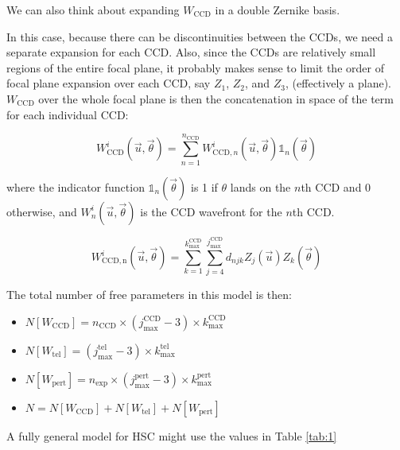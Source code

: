 \documentclass{article}
\begin{document}
We can also think about expanding $W_\mathrm{CCD}$ in a double Zernike basis.

In this case, because there can be discontinuities between the CCDs, we need a separate expansion
for each CCD.  Also, since the CCDs are relatively small regions of the entire focal plane, it
probably makes sense to limit the order of focal plane expansion over each CCD, say $Z_1$, $Z_2$,
and $Z_3$, (effectively a plane).  $W_\mathrm{CCD}$ over the whole focal plane is then the
concatenation in space of the term for each individual CCD:

\begin{equation}
    W^i_\mathrm{CCD}(\vec{u}, \vec{\theta}) = \sum_{n=1}^{n_\mathrm{CCD}} W^i_{\mathrm{CCD},n}(\vec{u}, \vec{\theta}) \mathbb{1}_n(\vec{\theta})
\end{equation}

where the indicator function $\mathbb{1}_n(\vec{\theta})$ is 1 if $\theta$ lands on the $n$th CCD
and 0 otherwise, and $W^i_n(\vec{u}, \vec{\theta})$ is the CCD wavefront for the $n$th CCD.

\begin{equation}
    W^i_\mathrm{CCD,n}(\vec{u}, \vec{\theta}) = \sum_{k=1}^{k^\mathrm{CCD}_\mathrm{max}} \sum_{j=4}^{j^\mathrm{CCD}_\mathrm{max}} d_{njk} Z_j(\vec{u}) Z_k(\vec{\theta})
\end{equation}

The total number of free parameters in this model is then:

\begin{itemize}
    \item $N[W_\mathrm{CCD}] = n_\mathrm{CCD} \times (j^\mathrm{CCD}_\mathrm{max}-3) \times k^\mathrm{CCD}_\mathrm{max}$
    \item $N[W_\mathrm{tel}] = (j^\mathrm{tel}_\mathrm{max}-3) \times k^\mathrm{tel}_\mathrm{max}$
    \item $N[W_\mathrm{pert}] = n_\mathrm{exp} \times (j^\mathrm{pert}_\mathrm{max}-3) \times k^\mathrm{pert}_\mathrm{max}$
    \item $N = N[W_\mathrm{CCD}] + N[W_\mathrm{tel}] + N[W_\mathrm{pert}]$
\end{itemize}

A fully general model for HSC might use the values in Table \ref{tab:1}
\end{document}
